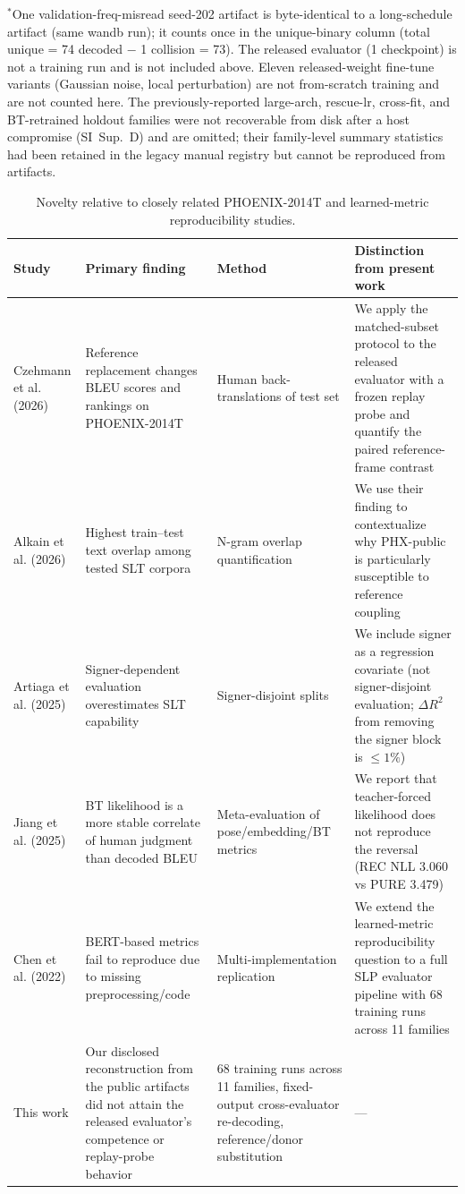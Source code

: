 \documentclass[pdflatex,sn-chicago]{sn-jnl}
\begin{document}
\begin{table}[h]
\begin{tabular}{p{2.8cm}rrrr}
\bottomrule
\end{tabular}
\par\smallskip
{\footnotesize $^*$One validation-freq-misread seed-202 artifact is byte-identical to a long-schedule artifact (same wandb run); it counts once in the unique-binary column (total unique = 74 decoded $-$ 1 collision = 73). The released evaluator (1 checkpoint) is not a training run and is not included above. Eleven released-weight fine-tune variants (Gaussian noise, local perturbation) are not from-scratch training and are not counted here. The previously-reported large-arch, rescue-lr, cross-fit, and BT-retrained holdout families were not recoverable from disk after a host compromise (SI~Sup.~D) and are omitted; their family-level summary statistics had been retained in the legacy manual registry but cannot be reproduced from artifacts.}
\end{table}

\begin{table}[h]
\centering
\scriptsize\setlength{\tabcolsep}{2pt}
\caption{Novelty relative to closely related PHOENIX-2014T and learned-metric reproducibility studies.}
\label{tab:novelty}
\begin{tabular}{p{3.0cm}p{3.3cm}p{3.3cm}p{4.0cm}}
\toprule
Study & Primary finding & Method & Distinction from present work \\
\midrule
Czehmann et al. (2026) & Reference replacement changes BLEU scores and rankings on PHOENIX-2014T & Human back-translations of test set & We apply the matched-subset protocol to the released evaluator with a frozen replay probe and quantify the paired reference-frame contrast \\
Alkain et al. (2026) & Highest train--test text overlap among tested SLT corpora & N-gram overlap quantification & We use their finding to contextualize why PHX-public is particularly susceptible to reference coupling \\
Artiaga et al. (2025) & Signer-dependent evaluation overestimates SLT capability & Signer-disjoint splits & We include signer as a regression covariate (not signer-disjoint evaluation; $\Delta R^2$ from removing the signer block is $\leq1\%$) \\
Jiang et al. (2025) & BT likelihood is a more stable correlate of human judgment than decoded BLEU & Meta-evaluation of pose/embedding/BT metrics & We report that teacher-forced likelihood does not reproduce the reversal (REC NLL 3.060 vs PURE 3.479) \\
Chen et al. (2022) & BERT-based metrics fail to reproduce due to missing preprocessing/code & Multi-implementation replication & We extend the learned-metric reproducibility question to a full SLP evaluator pipeline with 68 training runs across 11 families \\
This work & Our disclosed reconstruction from the public artifacts did not attain the released evaluator's competence or replay-probe behavior & 68 training runs across 11 families, fixed-output cross-evaluator re-decoding, reference/donor substitution & --- \\
\bottomrule
\end{tabular}
\end{table}
\end{document}
